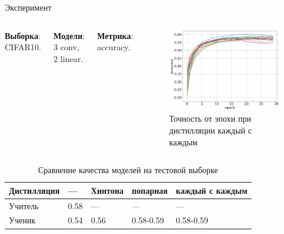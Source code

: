 \documentclass{beamer}
\begin{document}
\begin{frame}{Эксперимент}
    \begin{columns}[c]
        \textbf{Выборка}: CIFAR10.

        \textbf{Модели}: 3 conv, 2 linear.

        \textbf{Метрика}: accuracy.

        \begin{figure}
            \includegraphics[width=1.0\textwidth]{distill_epoch_accuracy.png}
            \caption{Точность от эпохи при дистилляции каждый с каждым}
        \end{figure}
    \end{columns}

    \begin{table}[]
        \begin{tabular}{|l|l|l|l|l|}
            \hline
            Дистилляция & ---  & Хинтона & попарная  & каждый с каждым \\ \hline
            Учитель     & 0.58 & ---     & ---       & ---             \\ \hline
            Ученик      & 0.54 & 0.56    & 0.58-0.59 & 0.58-0.59       \\ \hline
        \end{tabular}
        \caption{Сравнение качества моделей на тестовой выборке}
    \end{table}
\end{frame}

\end{document}
